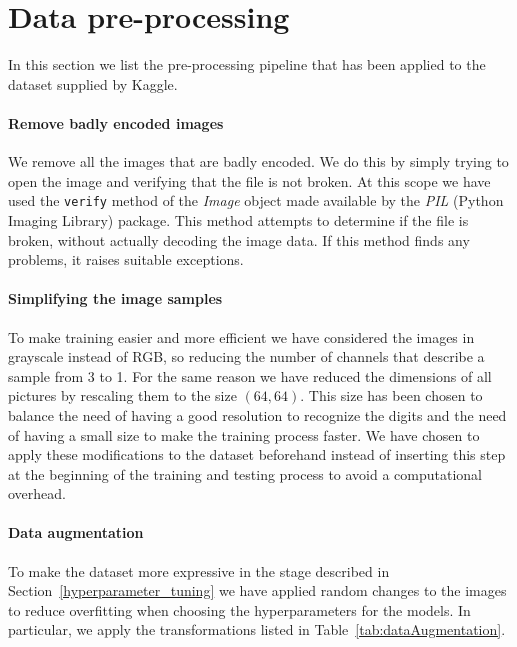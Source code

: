 \section{Data pre-processing}\label{1_preProcessing}
In this section we list the pre-processing pipeline that has been applied to the dataset supplied by Kaggle.

\paragraph{Remove badly encoded images}
We remove all the images that are badly encoded. We do this by simply trying to open the image and verifying that the file is not broken. At this scope we have used the \texttt{verify} method of the \textit{Image} object made available by the \textit{PIL} (Python Imaging Library) package. This method attempts to determine if the file is broken, without actually decoding the image data. If this method finds any problems, it raises suitable exceptions\cite{PILImageverify}.

\paragraph{Simplifying the image samples}
To make training easier and more efficient we have considered the images in grayscale instead of RGB, so reducing the number of channels that describe a sample from 3 to 1. For the same reason we have reduced the dimensions of all pictures by rescaling them to the size $\left(64,64\right)$. This size has been chosen to balance the need of having a good resolution to recognize the digits and the need of having a small size to make the training process faster. We have chosen to apply these modifications to the dataset beforehand instead of inserting this step at the beginning of the training and testing process to avoid a computational overhead.

\paragraph{Data augmentation}
To make the dataset more expressive in the stage described in Section~\ref{hyperparameter_tuning} we have applied random changes to the images to reduce overfitting when choosing the hyperparameters for the models. In particular, we apply the transformations listed in Table~\ref{tab:dataAugmentation}.

